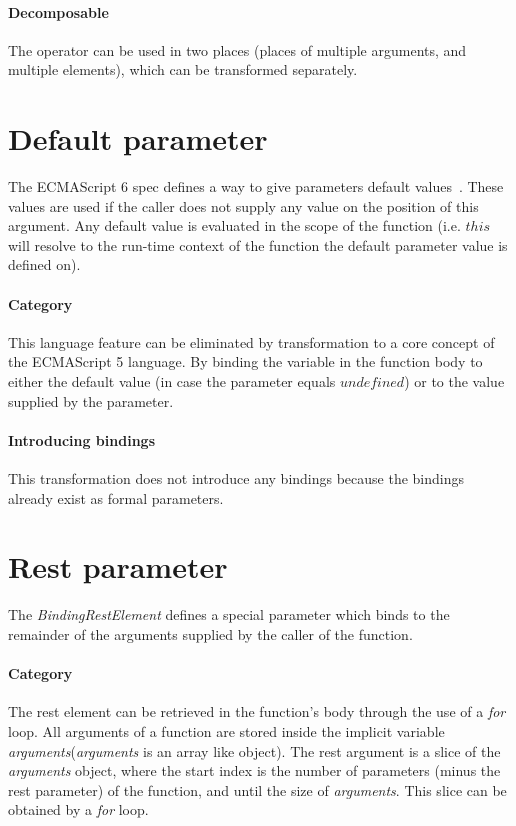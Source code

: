 \paragraph{Decomposable}
The operator can be used in two places (places of multiple arguments, and multiple elements), which can be transformed separately.

\section{Default parameter}
The ECMAScript 6 spec defines a way to give parameters default values~\cite[9.2.12]{SpecJS}. These values are used if the caller does not supply any value on the position of this argument. Any default value is evaluated in the scope of the function (i.e. $this$ will resolve to the run-time context of the function the default parameter value is defined on).

\paragraph{Category}
This language feature can be eliminated by transformation to a core concept of the ECMAScript 5 language. By binding the variable in the function body to either the default value (in case the parameter equals $undefined$) or to the value supplied by the parameter.

\paragraph{Introducing bindings}
This transformation does not introduce any bindings because the bindings already exist as formal parameters.

\section{Rest parameter}
The \textit{BindingRestElement} defines a special parameter which binds to the remainder of the arguments supplied by the caller of the function.\cite[14.1]{SpecJS}

\paragraph{Category}
The rest element can be retrieved in the function's body through the use of a \textit{for} loop. All arguments of a function are stored inside the implicit variable \textit{arguments}\footnotemark (\textit{arguments} is an array like object). The rest argument is a slice of the \textit{arguments} object, where the start index is the number of parameters (minus the rest parameter) of the function, and until the size of \textit{arguments}. This slice can be obtained by a \textit{for} loop.

